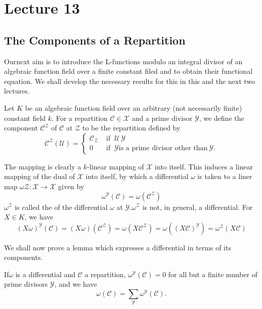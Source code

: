 \chapter{Lecture 13}\label{chap13}%

\setcounter{section}{25}
\section{The Components of a Repartition}\label{chap13:sec26}%

Our\pageoriginale next aim is to introduce the L-functions modulo an integral
divisor of an algebraic function field over a finite constant filed
and to obtain their functional equation. We shall develop the
necessary results for this in this and the next two lectures.  

Let $K$ be an algebraic function field over an arbitrary (not
necessarily finite) constant field $k$. For a repartition
$\mathscr{C} \in \mathscr{X}$ and a prime divisor
$\mathscr{Y}$, we define the component $\mathscr{C}^\mathscr{Z}$ of
$\mathscr{C}$ at $\mathscr{Z}$  to be the repartition defined by  
\begin{equation*}
  \mathscr{C}^\mathscr{Z} (\mathscr{U})=
  \begin{cases}
    \mathscr{C}_\mathscr{Z}& \text{ if }~\mathscr{U} ~\mathscr{Y}\\
    0 & \text{ if }~ \mathscr{Y} \text{is a prime divisor other than}~
    \mathscr{Y}. 
  \end{cases} 
\end{equation*}

The mapping is clearly a $k$-linear mapping of $\mathscr{X}$ into
itself. This induces a linear mapping of the dual of $\mathscr{X}$ into
itself, by which a differential $\omega$ is taken  to a liner map
$\omega \mathscr{Z} : \mathscr{X} \to \mathscr{X}$ given by  
$$
\omega^\mathscr{Y} (\mathscr{C}) = \omega (\mathscr{C}^\mathscr{Z})
$$
$\omega^\mathscr{Z}$ is called the  of the
differential $\omega$ at $\mathscr{Y}. \omega^\mathscr{Z}$ is not, in
general, a differential. For $X \in K$, we have 
$$
(X \omega)^\mathscr{Y} (\mathscr{C}) = (X \omega)
(\mathscr{C}^\mathscr{Z}) = \omega (X \mathscr{C}^\mathscr{Z}) =
\omega ((X \mathscr{C})^\mathscr{Y}) = \omega^\mathscr{Z} (X
\mathscr{C}) 
$$

We shall now prove a lemma which expresses a differential in terms of
its components. 

\begin{lemma*}
  If\pageoriginale $ \omega $ is a differential and $ \mathscr{C}$ a repartition, $
  \omega^\mathscr{Y} ( \mathscr{C} ) = 0 $ for all but  a finite
  number of prime divisors $ \mathscr{Y} $, and we have  
  $$
  \omega ( \mathscr{C} ) = \sum_{\mathscr{Y}} \omega^\mathscr{Y} ( \mathscr{C} ).
  $$
\end{lemma*}


